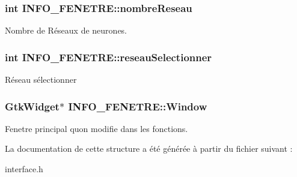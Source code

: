 \subsubsection[{\texorpdfstring{nombre\+Reseau}{nombreReseau}}]{\setlength{\rightskip}{0pt plus 5cm}int I\+N\+F\+O\+\_\+\+F\+E\+N\+E\+T\+R\+E\+::nombre\+Reseau}\hypertarget{structINFO__FENETRE_ab88f2bbddff749e8003f2b3178fd5602}{}\label{structINFO__FENETRE_ab88f2bbddff749e8003f2b3178fd5602}
Nombre de Réseaux de neurones. 
\subsubsection[{\texorpdfstring{reseau\+Selectionner}{reseauSelectionner}}]{\setlength{\rightskip}{0pt plus 5cm}int I\+N\+F\+O\+\_\+\+F\+E\+N\+E\+T\+R\+E\+::reseau\+Selectionner}\hypertarget{structINFO__FENETRE_a87ac81a3d0227737e3228bd5ad1f975d}{}\label{structINFO__FENETRE_a87ac81a3d0227737e3228bd5ad1f975d}
Réseau sélectionner 
\subsubsection[{\texorpdfstring{Window}{Window}}]{\setlength{\rightskip}{0pt plus 5cm}Gtk\+Widget$\ast$ I\+N\+F\+O\+\_\+\+F\+E\+N\+E\+T\+R\+E\+::\+Window}\hypertarget{structINFO__FENETRE_ad55c62f85a92f3163bca921dc73336dc}{}\label{structINFO__FENETRE_ad55c62f85a92f3163bca921dc73336dc}
Fenetre principal qu\textquotesingle{}on modifie dans les fonctions. 

La documentation de cette structure a été générée à partir du fichier suivant \+:\begin{DoxyCompactItemize}
\item 
interface.\+h\end{DoxyCompactItemize}
